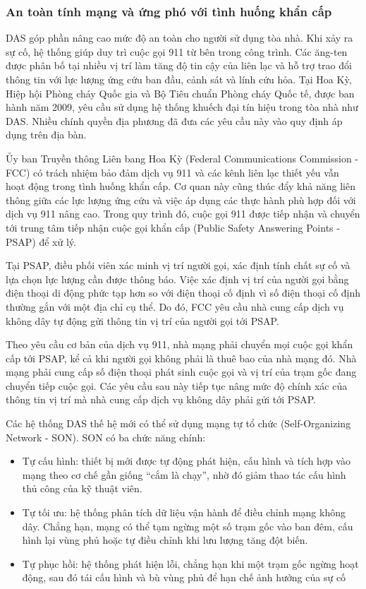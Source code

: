 \documentclass{thesis}
\begin{document}
\subsubsection{An toàn tính mạng và ứng phó với tình huống khẩn cấp}

DAS góp phần nâng cao mức độ an toàn cho người sử dụng tòa nhà. Khi
xảy ra sự cố, hệ thống giúp duy trì cuộc gọi 911 từ bên trong công
trình. Các ăng-ten được phân bố tại nhiều vị trí làm tăng độ tin cậy
của liên lạc và hỗ trợ trao đổi thông tin với lực lượng ứng cứu ban
đầu, cảnh sát và lính cứu hỏa. Tại Hoa Kỳ, Hiệp hội Phòng cháy Quốc
gia và Bộ Tiêu chuẩn Phòng cháy Quốc tế, được ban hành năm 2009, yêu cầu sử
dụng hệ thống khuếch đại tín hiệu trong tòa nhà như DAS. Nhiều chính
quyền địa phương đã đưa các yêu cầu này vào quy định áp dụng trên địa bàn.

Ủy ban Truyền thông Liên bang Hoa Kỳ (Federal Communications
Commission - FCC) có trách nhiệm bảo đảm
dịch vụ 911 và các kênh liên lạc thiết yếu vẫn hoạt động trong tình
huống khẩn cấp. Cơ quan này cũng thúc đẩy khả năng liên thông giữa
các lực lượng ứng cứu và việc áp dụng các thực hành phù hợp đối với
dịch vụ 911 nâng cao. Trong quy trình đó, cuộc gọi 911 được tiếp nhận
và chuyển tới trung tâm tiếp nhận cuộc gọi khẩn cấp (Public Safety
Answering Points - PSAP) để xử lý.

Tại PSAP, điều phối viên xác minh vị trí người gọi, xác định tính
chất sự cố và lựa chọn lực lượng cần được thông báo. Việc xác định vị
trí của người gọi bằng điện thoại di động phức tạp hơn so với điện
thoại cố định vì số điện thoại cố định thường gắn với một địa chỉ cụ
thể. Do đó, FCC yêu cầu nhà cung cấp dịch vụ không dây tự động gửi
thông tin vị trí của người gọi tới PSAP.

Theo yêu cầu cơ bản của dịch vụ 911, nhà mạng phải chuyển mọi cuộc
gọi khẩn cấp tới PSAP, kể cả khi người gọi không phải là thuê bao của
nhà mạng đó. Nhà mạng phải cung cấp số điện thoại phát sinh cuộc gọi
và vị trí của trạm gốc đang chuyển tiếp cuộc gọi. Các yêu cầu sau này
tiếp tục nâng mức độ chính xác của thông tin vị trí mà nhà cung cấp
dịch vụ không dây phải gửi tới PSAP.

Các hệ thống DAS thế hệ mới có thể sử dụng mạng tự tổ chức
(Self-Organizing Network - SON). SON có ba chức năng chính:

\begin{itemize}
  \item Tự cấu hình: thiết bị mới được tự động phát hiện, cấu hình và
    tích hợp vào mạng theo cơ chế gần giống “cắm là chạy”, nhờ đó
    giảm thao tác cấu hình thủ công của kỹ thuật viên.
  \item Tự tối ưu: hệ thống phân tích dữ liệu vận hành để điều chỉnh
    mạng không dây. Chẳng hạn, mạng có thể tạm ngừng một số trạm gốc
    vào ban đêm, cấu hình lại vùng phủ hoặc tự điều chỉnh khi lưu
    lượng tăng đột biến.
  \item Tự phục hồi: hệ thống phát hiện lỗi, chẳng hạn khi một trạm
    gốc ngừng hoạt động, sau đó tái cấu hình và bù vùng phủ để hạn
    chế ảnh hưởng của sự cố
\end{itemize}
\end{document}

